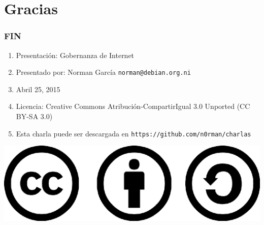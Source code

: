 \documentclass{beamer}
\begin{document}
\section{Gracias}
\begin{frame}
\frametitle{FIN}
	\begin{enumerate}
		\item Presentaci\'on: Gobernanza de Internet
		\item Presentado por: Norman Garc\'ia  \texttt{norman@debian.org.ni}
		\item Abril 25, 2015
		\item Licencia: Creative Commons Atribuci\'on-CompartirIgual 3.0 Unported (CC BY-SA 3.0)
		\item Esta charla puede ser descargada en \texttt{https://github.com/n0rman/charlas}
	\end{enumerate}

	\begin{center}
  		 \includegraphics[scale=0.20]{../img/cclogo.png}
	\end{center}

\end{frame}
\end{document}

